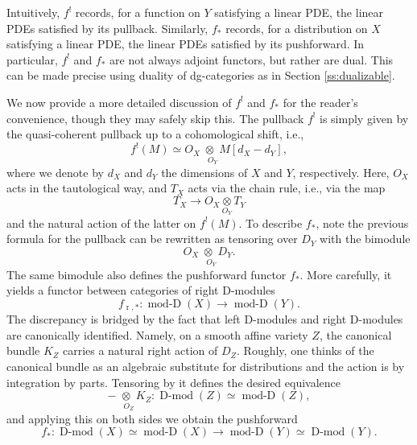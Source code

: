 \documentclass[10pt]{amsart}
\newcommand{\on}{\operatorname}
\newcommand{\Dmod}{\on{D-mod}}
\theoremstyle{remark}
\numberwithin{equation}{section}
\begin{document}
	Intuitively, $f^!$ records, for a function on $Y$ satisfying a linear PDE, the linear PDEs satisfied by its pullback. Similarly, $f_*$ records, for a distribution on $X$ satisfying a linear PDE, the linear PDEs satisfied by its pushforward. In particular, $f^!$ and $f_*$ are not always adjoint functors, but rather are dual. This can be made precise using duality of dg-categories as in Section \ref{ss:dualizable}. 
	 
	 
	 We now provide a more detailed discussion of $f^!$ and $f_*$ for the reader's convenience, though they may safely skip this. The pullback $f^!$ is simply given by the quasi-coherent pullback up to a cohomological shift, i.e., 
    \[
         f^!(M) \simeq O_X \underset{\phantom{ii}O_Y} \otimes M [d_X - d_Y],
    \]
	where we denote by $d_X$ and $d_Y$ the dimensions of $X$ and $Y$, respectively. Here, $O_X$ acts in the tautological way, and $T_X$ acts via the chain rule, i.e., via the map $$T_X \rightarrow O_X \underset {O_Y} \otimes T_Y$$and the natural action of the latter on $f^!(M)$. 
	To describe $f_*$, note the previous formula for the pullback can be rewritten as tensoring over $D_Y$ with the bimodule
	\[
	    O_X \underset {\phantom{ii}O_Y} \otimes D_Y.
	\]
	The same bimodule also defines the pushforward functor $f_*$. More carefully, it yields a functor between categories of right D-modules $$f_{\on{r}, *}: \on{mod-D}(X) \rightarrow \on{mod-D}(Y).$$
	The discrepancy is bridged by the fact that left D-modules and right D-modules are canonically identified. Namely, on a smooth affine variety $Z$, the canonical bundle $K_Z$ carries a natural right action of $D_Z$. Roughly, one thinks of the canonical bundle as an algebraic substitute for distributions and the action is by integration by parts. Tensoring by it defines the desired equivalence 
	\[
	   - \underset {\phantom{ii}O_Z} \otimes K_Z: \Dmod(Z) \simeq \on{mod-D}(Z), 
	\]
	and applying this on both sides we obtain the pushforward
	\[
	  f_*: \Dmod(X) \simeq \on{mod-D}(X) \rightarrow \on{mod-D}(Y) \simeq \Dmod(Y). 
	\]
	
	
	
	
	
	
\end{document}

